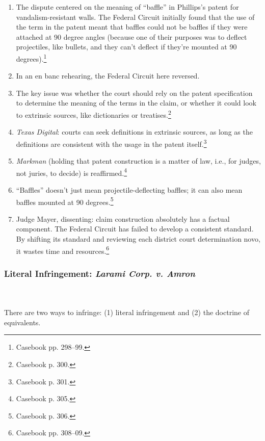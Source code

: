 \begin{enumerate}
    \item The dispute centered on the meaning of ``baffle'' in Phillips's 
    patent for vandalism-resistant walls. The Federal Circuit initially found 
    that the use of the term in the patent meant that baffles could not be 
    baffles if they were attached at 90 degree angles (because one of their 
    purposes was to deflect projectiles, like bullets, and they can't deflect if 
    they're mounted at 90 degrees).\footnote{Casebook pp. 298--99.}
    \item In an en banc rehearing, the Federal Circuit here reversed.
    \item The key issue was whether the court should rely on the patent 
    specification to determine the meaning of the terms in the claim, or 
    whether it could look to extrinsic sources, like dictionaries or 
    treatises.\footnote{Casebook p.  300.}
    \item \emph{Texas Digital}: courts can seek definitions in extrinsic 
    sources, as long as the definitions are consistent with the usage in the 
    patent itself.\footnote{Casebook p. 301.}
    \item \emph{Markman} (holding that patent construction is a matter of law, 
    i.e., for judges, not juries, to decide) is reaffirmed.\footnote{Casebook p. 
    305.}
    \item ``Baffles'' doesn't just mean projectile-deflecting baffles; it can 
    also mean baffles mounted at 90 degrees.\footnote{Casebook p. 306.}
    \item Judge Mayer, dissenting: claim construction absolutely has a factual 
    component. The Federal Circuit has failed to develop a consistent standard. 
    By shifting its standard and reviewing each district court determination 
    novo, it wastes time and resources.\footnote{Casebook pp. 308--09.}
\end{enumerate}

\subsubsection{Literal Infringement: \emph{Larami Corp. v. Amron}}
~\\\\
There are two ways to infringe: (1) literal infringement and (2) the doctrine 
of equivalents.

